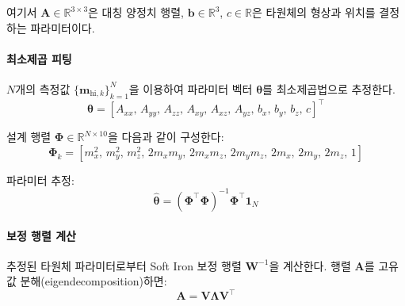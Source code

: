                \noindent 여기서 $\mathbf{A} \in \mathbb{R}^{3\times 3}$은 대칭 양정치 행렬, $\mathbf{b} \in \mathbb{R}^3$, $c \in \mathbb{R}$은 타원체의 형상과 위치를 결정하는 파라미터이다.\\

            \paragraph{최소제곱 피팅}
                $N$개의 측정값 $\{\mathbf{m}_{\text{hi},k}\}_{k=1}^N$을 이용하여 파라미터 벡터 $\boldsymbol{\theta}$를 최소제곱법으로 추정한다.\\

                \begin{equation}
                    \boldsymbol{\theta} = [A_{xx},\, A_{yy},\, A_{zz},\, A_{xy},\, A_{xz},\, A_{yz},\, b_x,\, b_y,\, b_z,\, c]^\top
                    \label{eq:ellipsoid_params}
                \end{equation}

                설계 행렬 $\boldsymbol{\Phi} \in \mathbb{R}^{N \times 10}$을 다음과 같이 구성한다:\\

                \begin{equation}
                    \boldsymbol{\Phi}_k = \left[ m_x^2,\, m_y^2,\, m_z^2,\, 2m_xm_y,\, 2m_xm_z,\, 2m_ym_z,\, 2m_x,\, 2m_y,\, 2m_z,\, 1 \right]
                    \label{eq:ellipsoid_design}
                \end{equation}

                파라미터 추정:\\

                \begin{equation}
                    \hat{\boldsymbol{\theta}} = \left(\boldsymbol{\Phi}^\top \boldsymbol{\Phi}\right)^{-1} \boldsymbol{\Phi}^\top \mathbf{1}_N
                    \label{eq:ellipsoid_ls}
                \end{equation}

            \paragraph{보정 행렬 계산}
                추정된 타원체 파라미터로부터 Soft Iron 보정 행렬 $\mathbf{W}^{-1}$을 계산한다. 행렬 $\mathbf{A}$를 고유값 분해(eigendecomposition)하면:\\

                \begin{equation}
                    \mathbf{A} = \mathbf{V} \boldsymbol{\Lambda} \mathbf{V}^\top
                    \label{eq:eigen_decomp}
                \end{equation}

